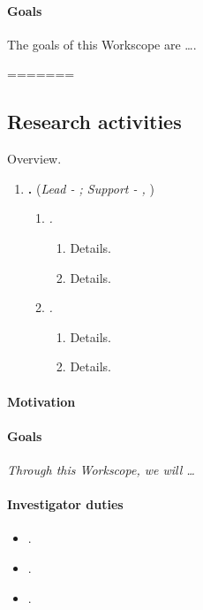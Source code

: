 \documentclass[11pt,a4paper]{article}
\begin{document}
\paragraph*{Goals}
The goals of this Workscope are \ldots .

=======
\subsection*{Research activities}
Overview.

\begin{enumerate}[topsep=0pt,itemsep=-0.5ex,partopsep=1ex,parsep=1ex,label=\textbf{Workscope \arabic* -},align=left,leftmargin=*]
    \item\textbf{.} (\textit{Lead - ; Support - , })
        \begin{enumerate}[series=innerlist,topsep=3pt,itemsep=1.5ex,partopsep=1ex,parsep=-1ex,label=\textit{Task \Roman*.},align=left,leftmargin=-0.50in]
            \item\textit{.}
                \begin{enumerate}[topsep=0pt,itemsep=-0.5ex,partopsep=1ex,parsep=1ex,label=(\arabic*),leftmargin=0.15in]
                    \item Details.
                    \item Details.
                \end{enumerate}
            \item\textit{.}
                \begin{enumerate}[topsep=0pt,itemsep=-0.5ex,partopsep=1ex,parsep=1ex,label=(\arabic*),leftmargin=0.15in]
                    \item Details.
                    \item Details.
                \end{enumerate}
        \end{enumerate}
\end{enumerate}


\paragraph*{Motivation}

\paragraph*{Goals}
\textit{Through this Workscope, we will \ldots}

\paragraph*{Investigator duties}
\begin{itemize}[topsep=0pt,itemsep=-0.5ex,partopsep=1ex,parsep=1ex,leftmargin=*]
    \item[].
    \item[].
    \item[].
\end{itemize}
\end{document}
